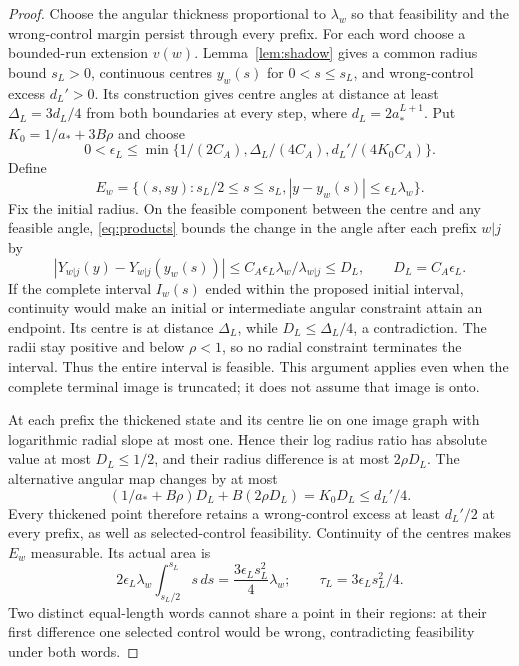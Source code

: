 \documentclass[11pt]{amsart}
\theoremstyle{definition}
\theoremstyle{remark}
\numberwithin{equation}{section}
\begin{document}
\begin{proof}
Choose the angular thickness proportional to $\lambda_w$ so that
feasibility and the wrong-control margin persist through every prefix.
For each word choose a bounded-run extension $v(w)$.
Lemma~\ref{lem:shadow} gives a common radius bound $s_L>0$,
continuous centres $y_w(s)$ for $0<s\le s_L$, and wrong-control
excess $d_L'>0$. Its construction gives centre angles at distance
at least $\Delta_L=3d_L/4$ from both boundaries at every step,
where $d_L=2a_*^{L+1}$.
Put $K_0=1/a_*+3B\rho$ and choose
\[
0<\epsilon_L\le\min\{1/(2C_A),\Delta_L/(4C_A),
                                      d_L'/(4K_0C_A)\}.
\]
Define
\begin{equation}\label{eq:forcedregion}
E_w=\{(s,sy):s_L/2\le s\le s_L,
                         |y-y_w(s)|\le\epsilon_L\lambda_w\}.
\end{equation}
Fix the initial radius. On the feasible component between the
centre and any feasible angle, \eqref{eq:products} bounds the
change in the angle after each prefix $w|j$ by
\begin{equation}\label{eq:thickangle}
|Y_{w|j}(y)-Y_{w|j}(y_w(s))|
 \le C_A\epsilon_L\lambda_w/\lambda_{w|j}
 \le D_L,\qquad D_L=C_A\epsilon_L.
\end{equation}
If the complete interval $I_w(s)$ ended within the proposed
initial interval, continuity would make an initial or intermediate
angular constraint attain an endpoint. Its centre is at distance
$\Delta_L$, while $D_L\le\Delta_L/4$, a contradiction.
The radii stay positive and below $\rho<1$, so no radial constraint
terminates the interval. Thus the entire interval is feasible.
This argument applies even when the complete terminal image is
truncated; it does not assume that image is onto.

At each prefix the thickened state and its centre lie on one image
graph with logarithmic radial slope at most one. Hence their log
radius ratio has absolute value at most $D_L\le1/2$, and their
radius difference is at most $2\rho D_L$.
The alternative angular map changes by at most
\[
(1/a_*+B\rho)D_L+B(2\rho D_L)=K_0D_L\le d_L'/4.
\]
Every thickened point therefore retains a wrong-control excess
at least $d_L'/2$ at every prefix, as well as selected-control
feasibility. Continuity of the centres makes $E_w$ measurable.
Its actual area is
\[
2\epsilon_L\lambda_w\int_{s_L/2}^{s_L}s\,ds
 =\frac{3\epsilon_Ls_L^2}{4}\lambda_w;
\qquad \tau_L=3\epsilon_Ls_L^2/4.
\]
Two distinct equal-length words cannot share a point in their
regions: at their first difference one selected control would
be wrong, contradicting feasibility under both words.


\end{proof}
\end{document}
